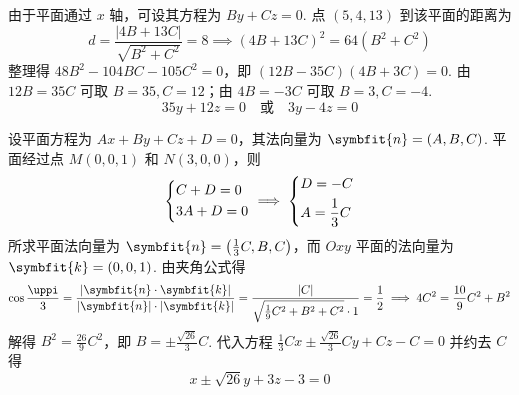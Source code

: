 \begin{solution}

    由于平面通过 $x$ 轴，可设其方程为 $By + Cz = 0$.
    点 $(5, 4, 13)$ 到该平面的距离为
    \begin{equation}
        d = \frac{|4B + 13C|}{\sqrt{B^2 + C^2}} = 8 \implies (4B + 13C)^2 = 64(B^2 + C^2)
    \end{equation}
    整理得 $48B^2 - 104BC - 105C^2 = 0$，即 $(12B - 35C)(4B + 3C) = 0$.
    由 $12B = 35C$ 可取 $B=35, C=12$；由 $4B = -3C$ 可取 $B=3, C=-4$.
    \begin{equation}
        \boxed{35y + 12z = 0 \quad \text{或} \quad 3y - 4z = 0}
    \end{equation}


    设平面方程为 $Ax + By + Cz + D = 0$，其法向量为 $\symbfit{n} = (A, B, C)$.
    平面经过点 $M(0, 0, 1)$ 和 $N(3, 0, 0)$，则
    \begin{equation}
        \begin{dcases}
            C + D = 0 \\
            3A + D = 0
        \end{dcases} \implies \begin{dcases}
            D = -C \\
            A = \frac{1}{3}C
        \end{dcases}
    \end{equation}
    所求平面法向量为 $\symbfit{n} = \left(\frac{1}{3}C, B, C\right)$，而 $Oxy$ 平面的法向量为 $\symbfit{k} = (0, 0, 1)$.
    由夹角公式得
    \begin{equation}
        \cos \frac{\uppi}{3} = \frac{|\symbfit{n} \cdot \symbfit{k}|}{|\symbfit{n}| \cdot |\symbfit{k}|} = \frac{|C|}{\sqrt{\frac{1}{9}C^2 + B^2 + C^2} \cdot 1} = \frac{1}{2} \implies 4C^2 = \frac{10}{9}C^2 + B^2
    \end{equation}
    解得 $B^2 = \frac{26}{9}C^2$，即 $B = \pm \frac{\sqrt{26}}{3}C$.
    代入方程 $\frac{1}{3}Cx \pm \frac{\sqrt{26}}{3}Cy + Cz - C = 0$ 并约去 $C$ 得
    \begin{equation}
        \boxed{x \pm \sqrt{26}y + 3z - 3 = 0}
    \end{equation}
\end{solution}

